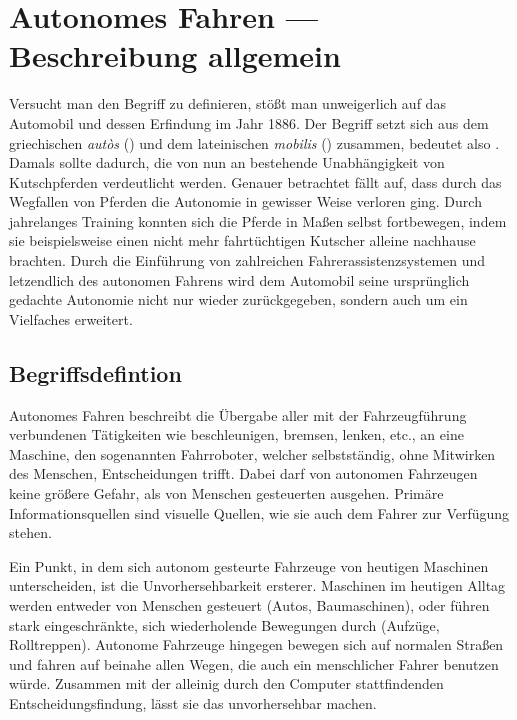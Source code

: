 \chapter{Autonomes Fahren --- Beschreibung allgemein}

Versucht man den Begriff  zu definieren, stößt man unweigerlich auf das Automobil und dessen Erfindung im Jahr 1886. Der Begriff  setzt sich aus dem griechischen \textit{autòs} () und dem lateinischen \textit{mobilis} () zusammen, bedeutet also . Damals sollte dadurch, die von nun an bestehende Unabhängigkeit von Kutschpferden verdeutlicht werden. Genauer betrachtet fällt auf, dass durch das Wegfallen von Pferden die Autonomie in gewisser Weise verloren ging. Durch jahrelanges Training konnten sich die Pferde in Maßen selbst fortbewegen, indem sie beispielsweise einen nicht mehr fahrtüchtigen Kutscher alleine nachhause brachten.
Durch die Einführung von zahlreichen Fahrerassistenzsystemen und letzendlich des autonomen Fahrens wird dem Automobil seine ursprünglich gedachte Autonomie nicht nur wieder zurückgegeben, sondern auch um ein Vielfaches erweitert.

\section{Begriffsdefintion}


Autonomes Fahren beschreibt die Übergabe aller mit der Fahrzeugführung verbundenen Tätigkeiten wie beschleunigen, bremsen, lenken, etc., an eine Maschine, den sogenannten Fahrroboter, welcher selbstständig, ohne Mitwirken des Menschen, Entscheidungen trifft. Dabei darf von autonomen Fahrzeugen keine größere Gefahr, als von Menschen gesteuerten ausgehen. Primäre Informationsquellen sind visuelle Quellen, wie sie auch dem Fahrer zur Verfügung stehen.

Ein Punkt, in dem sich autonom gesteurte Fahrzeuge von heutigen Maschinen unterscheiden, ist die Unvorhersehbarkeit ersterer. Maschinen im heutigen Alltag werden entweder von Menschen gesteuert (\zB Autos, Baumaschinen), oder führen stark eingeschränkte, sich wiederholende Bewegungen durch (\zB Aufzüge, Rolltreppen). Autonome Fahrzeuge hingegen bewegen sich auf normalen Straßen und fahren auf beinahe allen Wegen, die auch ein menschlicher Fahrer benutzen würde. Zusammen mit der alleinig durch den Computer stattfindenden Entscheidungsfindung, lässt sie das unvorhersehbar machen.

